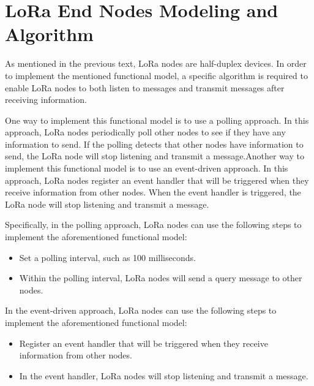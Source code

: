 \section{LoRa End Nodes Modeling and Algorithm}
As mentioned in the previous text, LoRa nodes are half-duplex devices. In order to implement the mentioned functional model, a specific algorithm is required to enable LoRa nodes to both listen to messages and transmit messages after receiving information.

One way to implement this functional model is to use a polling approach. In this approach, LoRa nodes periodically poll other nodes to see if they have any information to send. If the polling detects that other nodes have information to send, the LoRa node will stop listening and transmit a message.Another way to implement this functional model is to use an event-driven approach. In this approach, LoRa nodes register an event handler that will be triggered when they receive information from other nodes. When the event handler is triggered, the LoRa node will stop listening and transmit a message.

Specifically, in the polling approach, LoRa nodes can use the following steps to implement the aforementioned functional model:
\begin{itemize}
  \item Set a polling interval, such as 100 milliseconds.
  \item Within the polling interval, LoRa nodes will send a query message to other nodes.
\end{itemize}

In the event-driven approach, LoRa nodes can use the following steps to implement the aforementioned functional model:
\begin{itemize}
  \item Register an event handler that will be triggered when they receive information from other nodes.
  \item In the event handler, LoRa nodes will stop listening and transmit a message.
\end{itemize}

